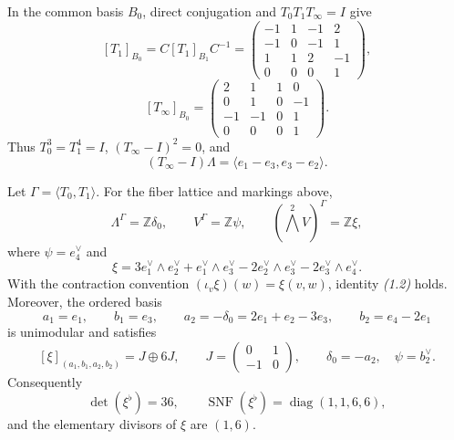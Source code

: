\documentclass[11pt]{article}
\numberwithin{equation}{section}
\begin{document}
In the common basis $B_0$, direct conjugation and
$T_0T_1T_\infty=I$ give
\[
 [T_1]_{B_0}=C[T_1]_{B_1}C^{-1}=
 \begin{pmatrix}
 -1&1&-1&2\\-1&0&-1&1\\1&1&2&-1\\0&0&0&1
 \end{pmatrix},                                                   \tag{1.6}
\]
\[
 [T_\infty]_{B_0}=
 \begin{pmatrix}
 2&1&1&0\\0&1&0&-1\\-1&-1&0&1\\0&0&0&1
 \end{pmatrix}.                                                   \tag{1.7}
\]
Thus $T_0^3=T_1^4=I$, $(T_\infty-I)^2=0$, and
\[
 (T_\infty-I)\Lambda
   =\langle e_1-e_3,e_3-e_2\rangle.                               \tag{1.8}
\]

\begin{theorem}
\label{thm:geometric-level-six}
Let $\Gamma=\langle T_0,T_1\rangle$.  For the fiber lattice and markings
above,
\[
 \Lambda^\Gamma=\mathbb Z\delta_0,
 \qquad V^\Gamma=\mathbb Z\psi,
 \qquad (\textstyle\bigwedge^2 V)^\Gamma=\mathbb Z\xi,             \tag{1.9}
\]
where $\psi=e_4^\vee$ and
\[
 \xi=3e_1^\vee\wedge e_2^\vee+e_1^\vee\wedge e_3^\vee
      -2e_2^\vee\wedge e_3^\vee-2e_3^\vee\wedge e_4^\vee.       \tag{1.10}
\]
With the contraction convention
$(\iota_v\xi)(w)=\xi(v,w)$, identity \emph{(1.2)} holds.  Moreover, the
ordered basis
\[
 a_1=e_1,\qquad b_1=e_3,\qquad
 a_2=-\delta_0=2e_1+e_2-3e_3,\qquad b_2=e_4-2e_1             \tag{1.11}
\]
is unimodular and satisfies
\[
 [\xi]_{(a_1,b_1,a_2,b_2)}=J\oplus6J,\qquad
 J=\begin{pmatrix}0&1\\-1&0\end{pmatrix},\qquad
 \delta_0=-a_2,\quad\psi=b_2^\vee.                             \tag{1.12}
\]
Consequently
\[
 \det(\xi^\flat)=36,\qquad
 \operatorname{SNF}(\xi^\flat)=\operatorname{diag}(1,1,6,6),     \tag{1.13}
\]
and the elementary divisors of $\xi$ are $(1,6)$.
\end{theorem}
\end{document}
